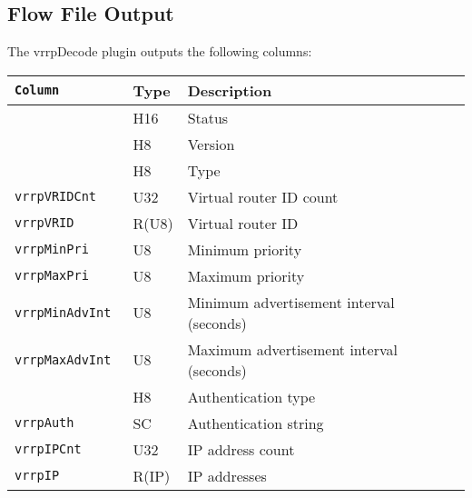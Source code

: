 \documentclass[documentation]{subfiles}
\begin{document}
\subsection{Flow File Output}
The vrrpDecode plugin outputs the following columns:
\begin{longtable}{>{\tt}lll}%
    \toprule
    {\bf Column}           & {\bf Type} & {\bf Description}                        \\ %
    \midrule\endhead%
    \nameref{vrrpStat}     & H16        & Status                                   \\ %
    \nameref{vrrpVer}      & H8         & Version                                  \\ %
    \nameref{vrrpType}     & H8         & Type                                     \\ %
    vrrpVRIDCnt            & U32        & Virtual router ID count                  \\ %
    vrrpVRID               & R(U8)      & Virtual router ID                        \\ %
    vrrpMinPri             & U8         & Minimum priority                         \\ %
    vrrpMaxPri             & U8         & Maximum priority                         \\ %
    vrrpMinAdvInt          & U8         & Minimum advertisement interval (seconds) \\ %
    vrrpMaxAdvInt          & U8         & Maximum advertisement interval (seconds) \\ %
    \nameref{vrrpAuthType} & H8         & Authentication type                      \\ %
    vrrpAuth               & SC         & Authentication string                    \\ %
    vrrpIPCnt              & U32        & IP address count                         \\ %
    vrrpIP                 & R(IP)      & IP addresses                             \\ %
    \bottomrule
\end{longtable}
\end{document}

